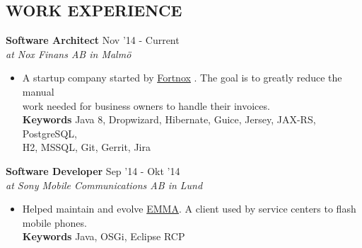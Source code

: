 \documentclass[overlapped]{res}
\begin{document}
 
\begin{resume}
\vspace{1.2cm}
\section{{\sc WORK EXPERIENCE}} 

{\bf Software Architect} \hfill Nov '14 - Current \\
{\sl at Nox Finans AB in Malmö}
\begin{itemize}
\itemsep -1pt
\item A startup company started by \href{http://www.fortnox.se/}{Fortnox} . The goal is to greatly reduce the manual 
\\work needed for business owners to handle their invoices.
\\{\bf Keywords} Java 8, Dropwizard, Hibernate, Guice, Jersey, JAX-RS, PostgreSQL,
\\H2, MSSQL, Git, Gerrit, Jira
\end{itemize}

{\bf Software Developer} \hfill Sep '14 - Okt '14 \\
{\sl at Sony Mobile Communications AB in Lund}
\begin{itemize}
\itemsep -1pt
\item Helped maintain and evolve \href{http://emma.extranet.sonyericsson.com/emma/}{EMMA}. A client used by service centers to flash 
\\mobile phones.
\\{\bf Keywords} Java, OSGi, Eclipse RCP 
\end{itemize}


\end{resume}
\end{document}
